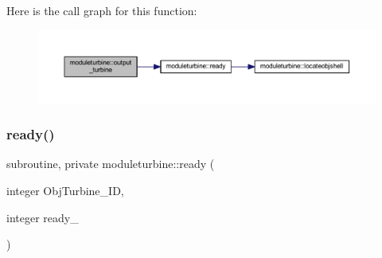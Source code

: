 Here is the call graph for this function\+:\nopagebreak
\begin{figure}[H]
\begin{center}
\leavevmode
\includegraphics[width=350pt]{namespacemoduleturbine_ab12d2233fd93cc941831900a0b5713c9_cgraph}
\end{center}
\end{figure}
\mbox{\label{namespacemoduleturbine_a05e91853a3be1ed656ff05d69618a83d}} 
\subsubsection{\texorpdfstring{ready()}{ready()}}
{\footnotesize\ttfamily subroutine, private moduleturbine\+::ready (\begin{DoxyParamCaption}\item[{integer}]{Obj\+Turbine\+\_\+\+ID,  }\item[{integer}]{ready\+\_\+ }\end{DoxyParamCaption})\hspace{0.3cm}{\ttfamily [private]}}

